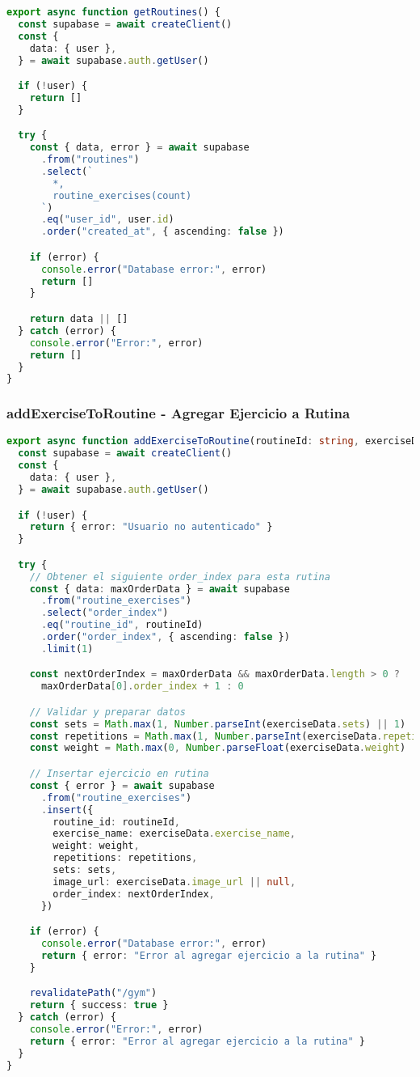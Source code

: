 \documentclass[12pt,a4paper]{article}
\begin{document}
\begin{lstlisting}[language=typescript, caption=Función getRoutines completa]
export async function getRoutines() {
  const supabase = await createClient()
  const {
    data: { user },
  } = await supabase.auth.getUser()

  if (!user) {
    return []
  }

  try {
    const { data, error } = await supabase
      .from("routines")
      .select(`
        *,
        routine_exercises(count)
      `)
      .eq("user_id", user.id)
      .order("created_at", { ascending: false })

    if (error) {
      console.error("Database error:", error)
      return []
    }

    return data || []
  } catch (error) {
    console.error("Error:", error)
    return []
  }
}
\end{lstlisting}

\subsubsection{addExerciseToRoutine - Agregar Ejercicio a Rutina}

\begin{lstlisting}[language=typescript, caption=Función addExerciseToRoutine completa]
export async function addExerciseToRoutine(routineId: string, exerciseData: any) {
  const supabase = await createClient()
  const {
    data: { user },
  } = await supabase.auth.getUser()

  if (!user) {
    return { error: "Usuario no autenticado" }
  }

  try {
    // Obtener el siguiente order_index para esta rutina
    const { data: maxOrderData } = await supabase
      .from("routine_exercises")
      .select("order_index")
      .eq("routine_id", routineId)
      .order("order_index", { ascending: false })
      .limit(1)

    const nextOrderIndex = maxOrderData && maxOrderData.length > 0 ? 
      maxOrderData[0].order_index + 1 : 0

    // Validar y preparar datos
    const sets = Math.max(1, Number.parseInt(exerciseData.sets) || 1)
    const repetitions = Math.max(1, Number.parseInt(exerciseData.repetitions) || 1)
    const weight = Math.max(0, Number.parseFloat(exerciseData.weight) || 0)

    // Insertar ejercicio en rutina
    const { error } = await supabase
      .from("routine_exercises")
      .insert({
        routine_id: routineId,
        exercise_name: exerciseData.exercise_name,
        weight: weight,
        repetitions: repetitions,
        sets: sets,
        image_url: exerciseData.image_url || null,
        order_index: nextOrderIndex,
      })

    if (error) {
      console.error("Database error:", error)
      return { error: "Error al agregar ejercicio a la rutina" }
    }

    revalidatePath("/gym")
    return { success: true }
  } catch (error) {
    console.error("Error:", error)
    return { error: "Error al agregar ejercicio a la rutina" }
  }
}
\end{lstlisting}
\end{document}
